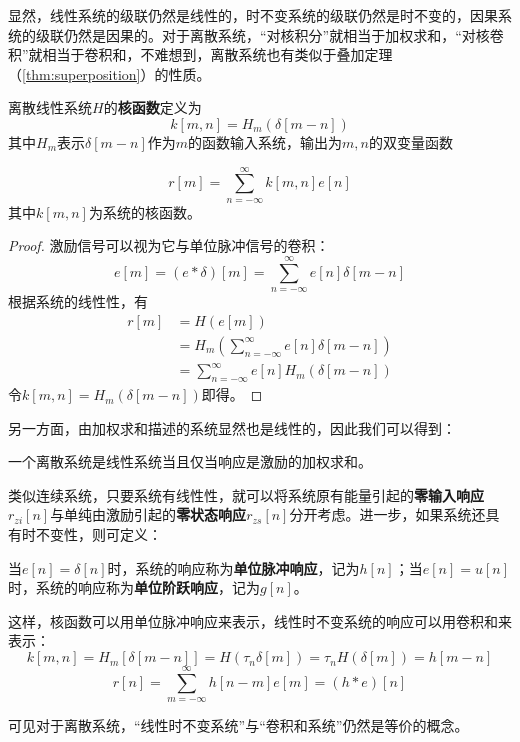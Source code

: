 显然，线性系统的级联仍然是线性的，时不变系统的级联仍然是时不变的，因果系统的级联仍然是因果的。对于离散系统，“对核积分”就相当于加权求和，“对核卷积”就相当于卷积和，不难想到，离散系统也有类似于叠加定理（\cref{thm:superposition}）的性质。

\begin{definition}[离散线性系统的核函数]
    离散线性系统$H$的\textbf{核函数}定义为
    $$k[m,n]=H_m(\delta[m-n])$$
    其中$H_m$表示$\delta[m-n]$作为$m$的函数输入系统，输出为$m,n$的双变量函数
\end{definition}

\begin{theorem}[叠加定理]
    \[r[m]=\sum_{n=-\infty}^{\infty}k[m,n]e[n]\]
    其中$k[m,n]$为系统的核函数。
\end{theorem}
\begin{proof}
    激励信号可以视为它与单位脉冲信号的卷积：
    \[e[m]=(e*\delta)[m]=\sum_{n=-\infty}^{\infty}e[n]\delta[m-n]\]
    根据系统的线性性，有
    \begin{align*}
        r[m]&=H(e[m])\\
        &=H_m\left(\sum_{n=-\infty}^{\infty}e[n]\delta[m-n]\right)\\
        &=\sum_{n=-\infty}^{\infty}e[n]H_m(\delta[m-n])
    \end{align*}
    令$k[m,n]=H_m(\delta[m-n])$即得。
\end{proof}

另一方面，由加权求和描述的系统显然也是线性的，因此我们可以得到：
\begin{proposition}[离散线性系统的等价定义]
    一个离散系统是线性系统当且仅当响应是激励的加权求和。
\end{proposition}

类似连续系统，只要系统有线性性，就可以将系统原有能量引起的\textbf{零输入响应}$r_{zi}[n]$与单纯由激励引起的\textbf{零状态响应}$r_{zs}[n]$分开考虑。进一步，如果系统还具有时不变性，则可定义：
\begin{definition}[单位脉冲响应与单位阶跃响应]
    当$e[n]=\delta[n]$时，系统的响应称为\textbf{单位脉冲响应}，记为$h[n]$；当$e[n]=u[n]$时，系统的响应称为\textbf{单位阶跃响应}，记为$g[n]$。
\end{definition}

这样，核函数可以用单位脉冲响应来表示，线性时不变系统的响应可以用卷积和来表示：
\[k[m,n]=H_m[\delta[m-n]]=H(\tau_n \delta[m])=\tau_n H(\delta[m])=h[m-n]\]
\[r[n]=\sum_{m=-\infty}^{\infty}h[n-m]e[m]=(h*e)[n]\]

可见对于离散系统，“线性时不变系统”与“卷积和系统”仍然是等价的概念。


